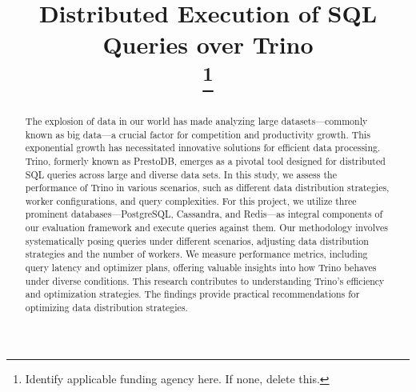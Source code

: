 \documentclass[conference]{IEEEtran}
\begin{document}
\title{Distributed Execution of SQL Queries over Trino \\
    \thanks{Identify applicable funding agency here. If none, delete this.}
}

\author{
    \and
}

\maketitle

\begin{abstract}

    The explosion of data in our world has made analyzing large datasets—commonly known as big data—a
    crucial factor for competition and productivity growth. This exponential growth has necessitated
    innovative solutions for efficient data processing. Trino, formerly known as PrestoDB, emerges as
    a pivotal tool designed for distributed SQL queries across large and diverse data sets. In this
    study, we assess the performance of Trino in various scenarios, such as different data distribution
    strategies,  worker configurations, and query complexities. For this project, we utilize three
    prominent databases—PostgreSQL, Cassandra, and Redis—as integral components of our evaluation
    framework and execute queries against them. Our methodology involves systematically posing queries
    under different scenarios, adjusting data distribution strategies and the number of workers. We
    measure performance metrics, including query latency and optimizer plans, offering valuable insights
    into how Trino behaves under diverse conditions. This research contributes to understanding Trino's
    efficiency and optimization strategies. The findings provide practical recommendations for optimizing
    data distribution strategies.

\end{abstract}
\end{document}
